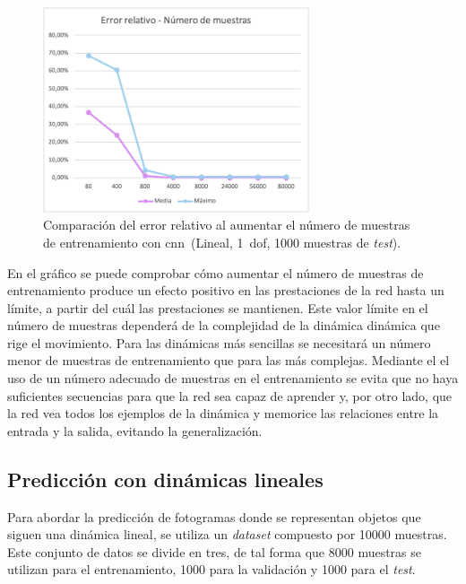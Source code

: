 \begin{figure}[H]
		\begin{center}
			\includegraphics[width=0.7\textwidth]{ figures/test_raw/NOREC/n_muestras.png}
			\caption{Comparación del error relativo al aumentar el número de muestras de entrenamiento con \acrshort{cnn}~(Lineal, 1~\acrshort{dof}, 1000 muestras de \textit{test}).}
			\label{fig.n_muestras}
		\end{center}
\end{figure}
\vspace{-10pt}


En el gráfico se puede comprobar cómo aumentar el número de muestras de entrenamiento produce un efecto positivo en las prestaciones de la red hasta un límite, a partir del cuál las prestaciones se mantienen. Este valor límite en el número de muestras dependerá de la complejidad de la dinámica  dinámica que rige el movimiento. Para las dinámicas más sencillas se necesitará un número menor de muestras de entrenamiento que para las más complejas. Mediante el el uso de un número adecuado de muestras en el entrenamiento se evita que no haya suficientes secuencias para que la red sea capaz de aprender y, por otro lado, que la red vea todos los ejemplos de la dinámica y memorice las relaciones entre la entrada y la salida, evitando la generalización.

\subsection{Predicción con dinámicas lineales}
Para abordar la predicción de fotogramas donde se representan objetos que siguen una dinámica lineal, se utiliza un \textit{dataset} compuesto por 10000 muestras. Este conjunto de datos se divide en tres, de tal forma que 8000 muestras se utilizan para el entrenamiento, 1000 para la validación y 1000 para el \textit{test}.\\

